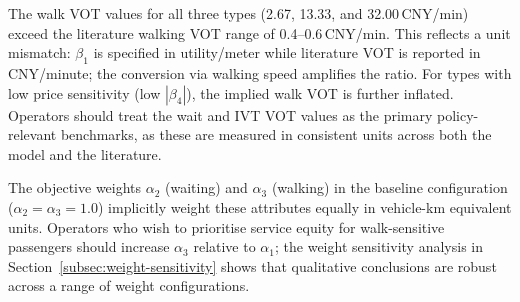 The walk VOT values for all three types (2.67, 13.33, and 32.00\,CNY/min)
exceed the literature walking VOT range of 0.4--0.6\,CNY/min. This reflects
a unit mismatch: $\beta_1$ is specified in utility/meter while literature VOT
is reported in CNY/minute; the conversion via walking speed amplifies the ratio.
For types with low price sensitivity (low $|\beta_4|$), the implied walk VOT
is further inflated. Operators should treat the wait and IVT VOT values as the
primary policy-relevant benchmarks, as these are measured in consistent units
across both the model and the literature.

The objective weights $\alpha_2$ (waiting) and $\alpha_3$ (walking) in the
baseline configuration ($\alpha_2 = \alpha_3 = 1.0$) implicitly weight these
attributes equally in vehicle-km equivalent units. Operators who wish to
prioritise service equity for walk-sensitive passengers should increase
$\alpha_3$ relative to $\alpha_1$; the weight sensitivity analysis in
Section~\ref{subsec:weight-sensitivity} shows that qualitative conclusions
are robust across a range of weight configurations.
